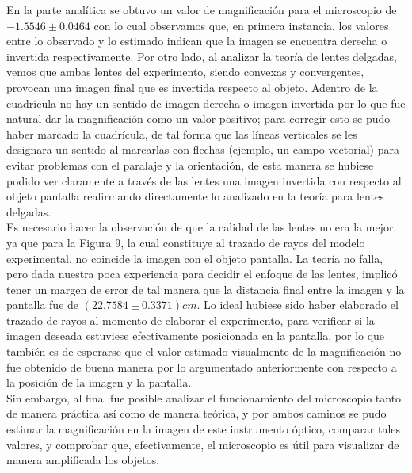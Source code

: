 \documentclass[10pt,a4paper]{article}
\begin{document}
En la parte analítica se obtuvo un valor de magnificación para el microscopio de $-1.5546 \pm 0.0464$ con lo cual observamos que, en primera instancia, los valores entre lo observado y lo estimado indican que la imagen se encuentra derecha o invertida respectivamente.
Por otro lado, al analizar la teoría de lentes delgadas, vemos que ambas lentes del experimento, siendo convexas y convergentes, provocan una imagen final que es invertida respecto al objeto.
Adentro de la cuadrícula no hay un sentido de imagen derecha o imagen invertida por lo que fue natural dar la magnificación como un valor positivo; para corregir esto se pudo haber marcado la cuadrícula, de tal forma que las líneas verticales se les designara un sentido al marcarlas con flechas (ejemplo, un campo vectorial) para evitar problemas con el paralaje y la orientación, de esta manera se hubiese podido ver claramente a través de las lentes una imagen invertida con respecto al objeto pantalla reafirmando directamente lo analizado en la teoría para lentes delgadas. \\[2mm]

Es necesario hacer la observación de que la calidad de las lentes no era la mejor, ya que para la Figura 9, la cual constituye al trazado de rayos del modelo experimental, no coincide la imagen con el objeto pantalla.
La teoría no falla, pero dada nuestra poca experiencia para decidir el enfoque de las lentes, implicó tener un margen de error de tal manera que la distancia final entre la imagen y la pantalla fue de $(22.7584\pm0.3371)cm$.
Lo ideal hubiese sido haber elaborado el trazado de rayos al momento de elaborar el experimento, para verificar si la imagen deseada estuviese efectivamente posicionada en la pantalla, por lo que también es de esperarse que el valor estimado visualmente de la magnificación no fue obtenido de buena manera por lo argumentado anteriormente con respecto a la posición de la imagen y la pantalla. \\[2mm]

Sin embargo, al final fue posible analizar el funcionamiento del microscopio tanto de manera práctica así como de manera teórica, y por ambos caminos se pudo estimar la magnificación en la imagen de este instrumento óptico, comparar tales valores, y comprobar que, efectivamente, el microscopio es útil para visualizar de manera amplificada los objetos. 



\end{document}
